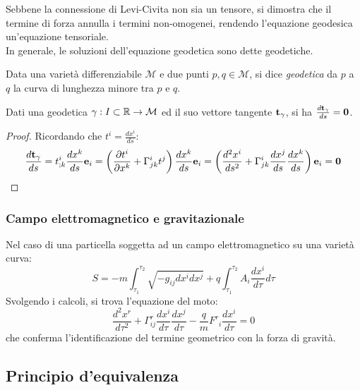 Sebbene la connessione di Levi-Civita non sia un tensore, si dimostra che il termine di forza annulla i termini non-omogenei, rendendo l'equazione geodesica un'equazione tensoriale.\\
In generale, le soluzioni dell'equazione geodetica sono dette geodetiche.
\begin{definition}
	Data una varietà differenziabile $ \mathcal{M} $ e due punti $ p,q\in\mathcal{M} $, si dice \textit{geodetica} da $ p $ a $ q $ la curva di lunghezza minore tra $ p $ e $ q $.
\end{definition}
\begin{proposition}
	Dati una geodetica $ \gamma : I \subset \mathbb{R} \rightarrow \mathcal{M} $ ed il suo vettore tangente $ \mathbf{t}_{\gamma} $, si ha $ \frac{d\mathbf{t}_{\gamma}}{ds} = \mathbf{0} $.
\end{proposition}
\begin{proof}
	Ricordando che $ t^i = \frac{dx^i}{ds} $:
	\begin{equation*}
		\frac{d\mathbf{t}_{\gamma}}{ds} = t^i_{;k} \frac{dx^k}{ds} \mathbf{e}_i = \left( \frac{\partial t^i}{\partial x^k} + \Gamma^i_{jk} t^j \right) \frac{dx^k}{ds} \mathbf{e}_i = \left( \frac{d^2 x^i}{ds^2} + \Gamma^i_{jk} \frac{dx^j}{ds} \frac{dx^k}{ds} \right) \mathbf{e}_i = \mathbf{0}
	\end{equation*}
\end{proof}

\subsubsection{Campo elettromagnetico e gravitazionale}

Nel caso di una particella soggetta ad un campo elettromagnetico su una varietà curva:
\begin{equation}
	S = -m \int_{\tau_1}^{\tau_2} \sqrt{- g_{ij} dx^i dx^j} + q \int_{\tau_1}^{\tau_2} A_i \frac{dx^i}{d\tau} d\tau
	\label{eq:5.13}
\end{equation}
Svolgendo i calcoli, si trova l'equazione del moto:
\begin{equation}
	\frac{d^2 x^r}{d\tau^2} + \Gamma^r_{ij} \frac{dx^i}{d\tau} \frac{dx^j}{d\tau} - \frac{q}{m} F^r_{\,\,\,i} \frac{dx^i}{d\tau} = 0
	\label{eq:5.14}
\end{equation}
che conferma l'identificazione del termine geometrico con la forza di gravità.

\subsection{Principio d'equivalenza}

